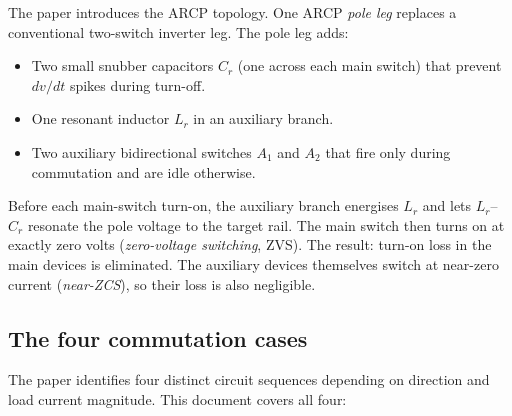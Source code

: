 \documentclass[12pt, a4paper]{article}
\begin{document}
The paper introduces the ARCP topology.
One ARCP \emph{pole leg} replaces a conventional two-switch inverter leg.
The pole leg adds:
\begin{itemize}
    \item Two small snubber capacitors $C_r$ (one across each main switch)
          that prevent $dv/dt$ spikes during turn-off.
    \item One resonant inductor $L_r$ in an auxiliary branch.
    \item Two auxiliary bidirectional switches $A_1$ and $A_2$ that fire
          only during commutation and are idle otherwise.
\end{itemize}
Before each main-switch turn-on, the auxiliary branch energises $L_r$
and lets $L_r$–$C_r$ resonate the pole voltage to the target rail.
The main switch then turns on at exactly zero volts (\emph{zero-voltage
switching}, ZVS).
The result: turn-on loss in the main devices is eliminated.
The auxiliary devices themselves switch at near-zero current
(\emph{near-ZCS}), so their loss is also negligible.

\subsection*{The four commutation cases}

The paper identifies four distinct circuit sequences depending on
direction and load current magnitude.
This document covers all four:
\end{document}

